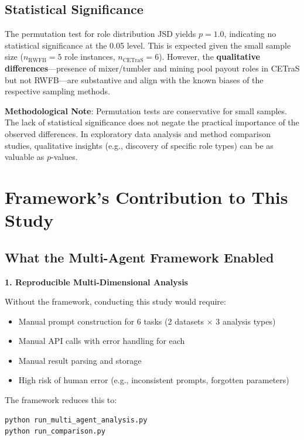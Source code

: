 \subsection{Statistical Significance}

The permutation test for role distribution JSD yields $p=1.0$, indicating no statistical significance at the 0.05 level. This is expected given the small sample size ($n_{\text{RWFB}}=5$ role instances, $n_{\text{CETraS}}=6$). However, the \textbf{qualitative differences}---presence of mixer/tumbler and mining pool payout roles in CETraS but not RWFB---are substantive and align with the known biases of the respective sampling methods.

\textbf{Methodological Note}: Permutation tests are conservative for small samples. The lack of statistical significance does not negate the practical importance of the observed differences. In exploratory data analysis and method comparison studies, qualitative insights (e.g., discovery of specific role types) can be as valuable as $p$-values.


\section{Framework's Contribution to This Study}\label{sec:framework-role}

\subsection{What the Multi-Agent Framework Enabled}

\textbf{1. Reproducible Multi-Dimensional Analysis}

Without the framework, conducting this study would require:
\begin{itemize}
    \item Manual prompt construction for 6 tasks (2 datasets $\times$ 3 analysis types)
    \item Manual API calls with error handling for each
    \item Manual result parsing and storage
    \item High risk of human error (e.g., inconsistent prompts, forgotten parameters)
\end{itemize}

The framework reduces this to:
\begin{verbatim}
python run_multi_agent_analysis.py
python run_comparison.py
\end{verbatim}

